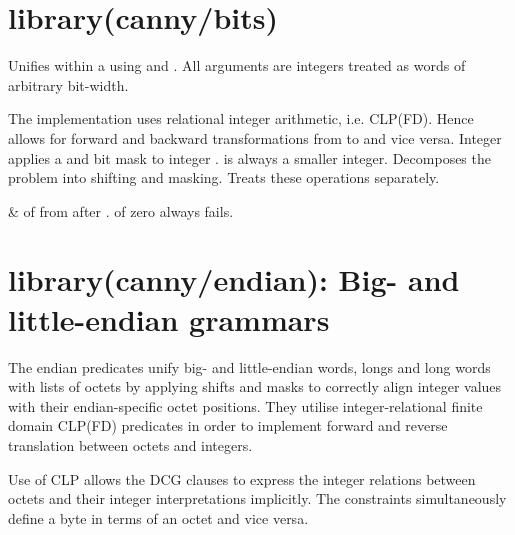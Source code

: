 \chapter{library(canny/bits)}\label{sec:bits}

\begin{description}
Unifies  within a  using  and . All arguments are
integers treated as words of arbitrary bit-width.

The implementation uses relational integer arithmetic, i.e. CLP(FD).
Hence allows for forward and backward transformations from  to
 and vice versa. Integer  applies a  and bit  mask
to integer .  is always a smaller integer. Decomposes the
problem into shifting and masking. Treats these operations
separately.

\begin{arguments}
 & of  from  after .  of zero always
fails. \\
\end{arguments}
\end{description}

\chapter{library(canny/endian): Big- and little-endian grammars}\label{sec:endian}

The endian predicates unify big- and little-endian words, longs and
long words with lists of octets by applying shifts and masks to
correctly align integer values with their endian-specific octet
positions. They utilise integer-relational finite domain CLP(FD)
predicates in order to implement forward and reverse translation
between octets and integers.

Use of CLP allows the DCG clauses to express the integer relations
between octets and their integer interpretations implicitly. The
constraints simultaneously define a byte in terms of an octet and
vice versa.\vspace{0.7cm}

